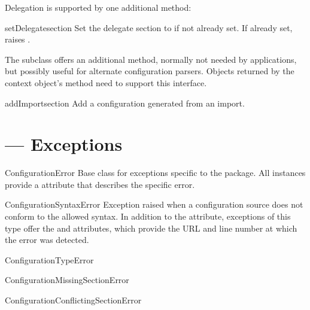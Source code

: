 \documentclass{howto}
\begin{document}
Delegation is supported by one additional method:

\begin{methoddesc}[Configuration]{setDelegate}{section}
  Set the delegate section to  if not already set.  If
  already set, raises .
\end{methoddesc}


The  subclass offers an additional
method, normally not needed by applications, but possibly useful for
alternate configuration parsers.  Objects returned by the
context object's  method need to
support this interface.

\begin{methoddesc}[ImportingConfiguration]{addImport}{section}
  Add a configuration generated from an import.
\end{methoddesc}


\section{ --- Exceptions}


\begin{excdesc}{ConfigurationError}
  Base class for exceptions specific to the  package.
  All instances provide a  attribute that describes
  the specific error.
\end{excdesc}

\begin{excdesc}{ConfigurationSyntaxError}
  Exception raised when a configuration source does not conform to the
  allowed syntax.  In addition to the  attribute,
  exceptions of this type offer the  and 
  attributes, which provide the URL and line number at which the error
  was detected.
\end{excdesc}

\begin{excdesc}{ConfigurationTypeError}
\end{excdesc}

\begin{excdesc}{ConfigurationMissingSectionError}
\end{excdesc}

\begin{excdesc}{ConfigurationConflictingSectionError}
\end{excdesc}
\end{document}
